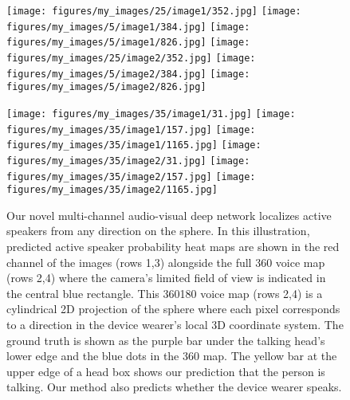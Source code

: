 \documentclass[10pt,twocolumn,letterpaper]{article}
\begin{document}
\begin{figure}[tb]
\centering
\texttt{[image: figures/my\_images/25/image1/352.jpg]}\hspace{\fill}
\texttt{[image: figures/my\_images/5/image1/384.jpg]}\hspace{\fill}
\texttt{[image: figures/my\_images/5/image1/826.jpg]}\linebreak
\texttt{[image: figures/my\_images/25/image2/352.jpg]}\hspace{\fill}
\texttt{[image: figures/my\_images/5/image2/384.jpg]}\hspace{\fill}
\texttt{[image: figures/my\_images/5/image2/826.jpg]}\vspace{0.2em}

\texttt{[image: figures/my\_images/35/image1/31.jpg]}\hspace{\fill}
\texttt{[image: figures/my\_images/35/image1/157.jpg]}\hspace{\fill}
\texttt{[image: figures/my\_images/35/image1/1165.jpg]}\linebreak
\texttt{[image: figures/my\_images/35/image2/31.jpg]}\hspace{\fill}
\texttt{[image: figures/my\_images/35/image2/157.jpg]}\hspace{\fill}
\texttt{[image: figures/my\_images/35/image2/1165.jpg]}\vspace{-5pt}
\caption{Our novel multi-channel audio-visual deep network localizes active speakers from any direction on the sphere. In this illustration, predicted active speaker probability heat maps are shown in the red channel of the images (rows 1,3) 
	alongside the full 360 voice map (rows 2,4) where the camera's limited field of view is indicated in the central blue rectangle. 
	This 360180 voice map (rows 2,4) is a cylindrical 2D projection of the sphere
	where each pixel corresponds to a direction in the device wearer's local 3D coordinate system. 
	The ground truth is shown as the purple bar under the talking head's 
	lower edge and the blue dots in the 360 map. The yellow bar at the upper edge of a head box shows
	our prediction that the person is talking. Our method also predicts whether the device wearer speaks.
	}
\vspace{-10pt}	
\label{fig:teaser}	
\end{figure}
\end{document}
